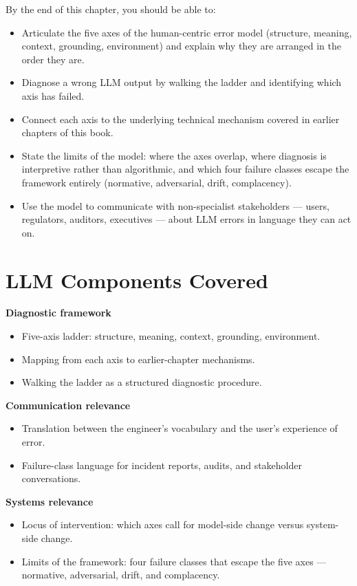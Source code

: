 By the end of this chapter, you should be able to:
\begin{itemize}
  \item Articulate the five axes of the human-centric error model
        (structure, meaning, context, grounding, environment) and
        explain why they are arranged in the order they are.
  \item Diagnose a wrong LLM output by walking the ladder and
        identifying which axis has failed.
  \item Connect each axis to the underlying technical mechanism
        covered in earlier chapters of this book.
  \item State the limits of the model: where the axes overlap,
        where diagnosis is interpretive rather than algorithmic,
        and which four failure classes escape the framework
        entirely (normative, adversarial, drift, complacency).
  \item Use the model to communicate with non-specialist
        stakeholders --- users, regulators, auditors, executives
        --- about LLM errors in language they can act on.
\end{itemize}

\section{LLM Components Covered}

\textbf{Diagnostic framework}
\begin{itemize}
  \item Five-axis ladder: structure, meaning, context, grounding,
        environment.
  \item Mapping from each axis to earlier-chapter mechanisms.
  \item Walking the ladder as a structured diagnostic procedure.
\end{itemize}

\textbf{Communication relevance}
\begin{itemize}
  \item Translation between the engineer's vocabulary and the
        user's experience of error.
  \item Failure-class language for incident reports, audits, and
        stakeholder conversations.
\end{itemize}

\textbf{Systems relevance}
\begin{itemize}
  \item Locus of intervention: which axes call for model-side
        change versus system-side change.
  \item Limits of the framework: four failure classes that escape
        the five axes --- normative, adversarial, drift, and
        complacency.
\end{itemize}

